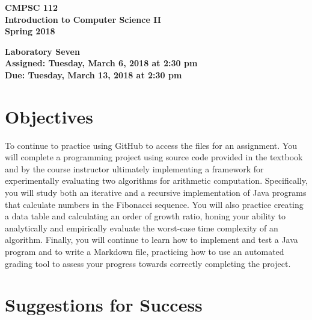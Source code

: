 \documentclass[11pt]{article}
\newcommand{\assignmentduedate}{March 13}
\newcommand{\assignmentassignedate}{March 6}
\newcommand{\assignmentnumber}{Seven}
\newcommand{\labyear}{2018}
\newcommand{\labday}{Tuesday}
\newcommand{\labtime}{2:30 pm}
\newcommand{\assigneddate}{Assigned: \labday, \assignmentassignedate, \labyear{} at \labtime{}}
\newcommand{\duedate}{Due: \labday, \assignmentduedate, \labyear{} at \labtime{}}
\newcommand{\labtitle}[1]
{
  \begin{center}
    \begin{center}
      \bf
      CMPSC 112\\Introduction to Computer Science II\\
      Spring 2018\\
      \medskip
    \end{center}
    \bf
    #1
  \end{center}
}
\begin{document}
\thispagestyle{empty}

\labtitle{Laboratory \assignmentnumber{} \\ \assigneddate{} \\ \duedate{}}

\section*{Objectives}

To continue to practice using GitHub to access the files for an assignment. You
will complete a programming project using source code provided in the textbook
and by the course instructor ultimately implementing a framework for
experimentally evaluating two algorithms for arithmetic computation.
Specifically, you will study both an iterative and a recursive implementation of
Java programs that calculate numbers in the Fibonacci sequence. You will also
practice creating a data table and calculating an order of growth ratio, honing
your ability to analytically and empirically evaluate the worst-case time
complexity of an algorithm. Finally, you will continue to learn how to implement
and test a Java program and to write a Markdown file, practicing how to use an
automated grading tool to assess your progress towards correctly completing the
project.

\section*{Suggestions for Success}
\end{document}
